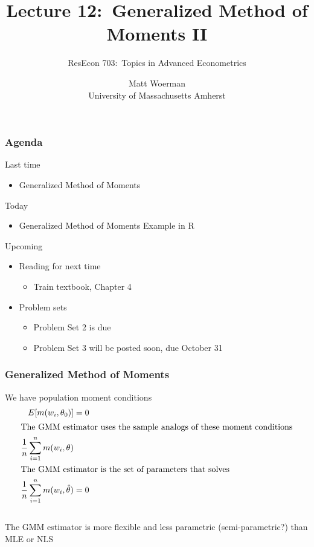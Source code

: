\documentclass{beamer}
\title[Lecture 12:\ Generalized Method of Moments II]{Lecture 12:\ Generalized Method of Moments II}
\author[ResEcon 703:\ Advanced Econometrics]{ResEcon 703:\ Topics in Advanced Econometrics}
\date{Matt Woerman\\University of Massachusetts Amherst}
\begin{document}
{ 
\begin{frame}[noframenumbering]
    \titlepage
\end{frame}
}

\begin{frame}\frametitle{Agenda}
    Last time
    \begin{itemize}
        \item Generalized Method of Moments
    \end{itemize}
    \vspace{2ex}
    Today
    \begin{itemize}
        \item Generalized Method of Moments Example in R
    \end{itemize}
    \vspace{2ex}
    Upcoming
    \begin{itemize}
        \item Reading for next time
        \begin{itemize}
            \item Train textbook, Chapter 4
        \end{itemize}
        \item Problem sets
        \begin{itemize}
            \item Problem Set 2 is due
            \item Problem Set 3 will be posted soon, due October 31
        \end{itemize}
    \end{itemize}
\end{frame}

\begin{frame}\frametitle{Generalized Method of Moments}
    We have population moment conditions
    \begin{align*}
        E[m(w_i, \theta_0)] &= 0 \\
        \intertext{The GMM estimator uses the sample analogs of these moment conditions}
        \frac{1}{n} \sum_{i = 1}^n m(w_i, \theta) & \\
        \intertext{The GMM estimator is the set of parameters that solves}
        \frac{1}{n} \sum_{i = 1}^n m(w_i, \hat{\theta}) &= 0
    \end{align*} \\
    \vspace{2ex}
    The GMM estimator is more flexible and less parametric (semi-parametric?) than MLE or NLS
\end{frame}
\end{document}
